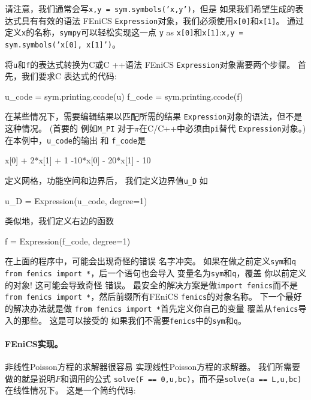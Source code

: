 
\begin{notice}
请注意，我们通常会写\texttt{x,y = sym.symbols('x,y')}，但是
如果我们希望生成的表达式具有有效的语法
FEniCS \texttt{Expression}对象，我们必须使用\texttt{x[0]}和\texttt{x[1]}。
通过定义\texttt{x}的名称，\texttt{sympy}可以轻松实现这一点
\texttt{y} as \texttt{x[0]}和\texttt{x[1]}:\texttt{x,y = sym.symbols('x[0], x[1]')}。
\end{notice}

将\texttt{u}和\texttt{f}的表达式转换为C或C ++语法
FEniCS \texttt{Expression}对象需要两个步骤。 首先，我们要求C
表达式的代码:

\begin{python}
u_code = sym.printing.ccode(u)
f_code = sym.printing.ccode(f)
\end{python}
在某些情况下，需要编辑结果以匹配所需的结果
\texttt{Expression}对象的语法，但不是这种情况。 (首要的
例如\verb!M_PI! 对于$\pi$在C/C++中必须由\texttt{pi}替代
\texttt{Expression}对象。)在本例中，\verb!u_code!的输出 和
\verb!f_code!是

\begin{c}
x[0] + 2*x[1] + 1
-10*x[0] - 20*x[1] - 10
\end{c}
定义网格，功能空间和边界后，
我们定义边界值\verb!u_D! 如

\begin{python}
u_D = Expression(u_code, degree=1)
\end{python}
类似地，我们定义右边的函数

\begin{python}
f = Expression(f_code, degree=1)
\end{python}

\begin{notice}[命名FEniCS与程序变量之间的冲突]
在上面的程序中，可能会出现奇怪的错误
名字冲突。 如果在做之前定义\texttt{sym}和\texttt{q}
\texttt{from fenics import *}，后一个语句也会导入
变量名为\texttt{sym}和\texttt{q}，覆盖
你以前定义的对象! 这可能会导致奇怪
错误。 最安全的解决方案是做\texttt{import fenics}而不是
\texttt{from fenics import *}，然后前缀所有FEniCS
\texttt{fenics}的对象名称。 下一个最好的解决办法就是做
\texttt{from fenics import *}首先定义你自己的变量
覆盖从\texttt{fenics}导入的那些。 这是可以接受的
如果我们不需要\texttt{fenics}中的\texttt{sym}和\texttt{q}。
\end{notice}

\paragraph{FEniCS实现。}
非线性Poisson方程的求解器很容易
实现线性Poisson方程的求解器。
我们所需要做的就是说明$F$和调用的公式
\texttt{solve(F == 0,u,bc)}，而不是\texttt{solve(a == L,u,bc)}
在线性情况下。 这是一个简约代码:

